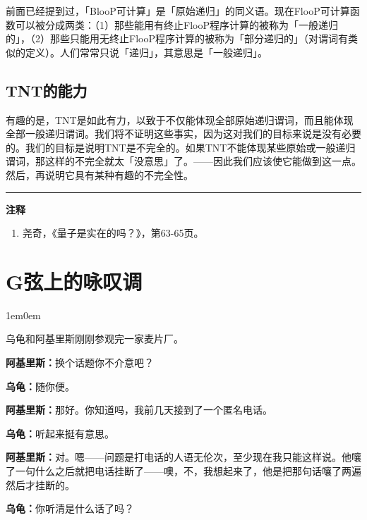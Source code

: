 \documentclass[
  12pt,
  twoside,
  openright,
  oldfontcommands,
]{memoir}
\newcommand{\dialogname}[1]{{\heifamily\bfseries #1}}
\newenvironment{dialogguide}{%
  \begin{adjustwidth}{1em}{0em}\kaitifamily\itshape\small%
}{%
  \end{adjustwidth}%
}
\begin{document}
前面已经提到过，「BlooP可计算」是「原始递归」的同义语。现在FlooP可计算函数可以被分成两类：（1）那些能用有终止FlooP程序计算的被称为「一般递归的」，（2）那些只能用无终止FlooP程序计算的被称为「部分递归的」（对谓词有类似的定义）。人们常常只说「递归」，其意思是「一般递归」。

\section{TNT的能力}

有趣的是，TNT是如此有力，以致于不仅能体现全部原始递归谓词，而且能体现全部一般递归谓词。我们将不证明这些事实，因为这对我们的目标来说是没有必要的。我们的目标是说明TNT是不完全的。如果TNT不能体现某些原始或一般递归谓词，那这样的不完全就太「没意思」了。------因此我们应该使它能做到这一点。然后，再说明它具有某种有趣的不完全性。

{\footnotesize\setlength{\parindent}{0pt}%
\noindent\textcolor{rulegray}{\rule{0.35\linewidth}{0.3pt}}\par\vspace{2pt}
\noindent\textbf{注释}\par\vspace{3pt}
\begin{enumerate}
\label{fn:Chapter13-1}{}
\item 尧奇，《量子是实在的吗？》，第63-65页。
\end{enumerate}
}

\label{Dialog14.xhtml}{}

\chapter*{G弦上的咏叹调}

\begin{dialogguide}
乌龟和阿基里斯刚刚参观完一家麦片厂。
\end{dialogguide}

\dialogname{阿基里斯：}换个话题你不介意吧？

\dialogname{乌龟：}随你便。

\dialogname{阿基里斯：}那好。你知道吗，我前几天接到了一个匿名电话。

\dialogname{乌龟：}听起来挺有意思。

\dialogname{阿基里斯：}对。嗯------问题是打电话的人语无伦次，至少现在我只能这样说。他嚷了一句什么之后就把电话挂断了------噢，不，我想起来了，他是把那句话嚷了两遍然后才挂断的。

\dialogname{乌龟：}你听清是什么话了吗？
\end{document}
